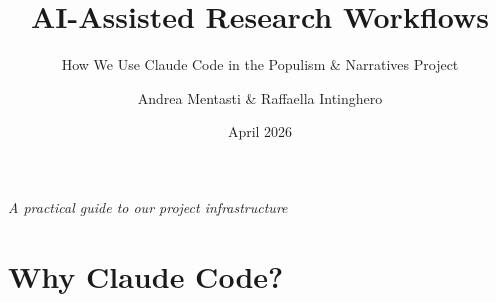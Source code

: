 \documentclass[aspectratio=169,11pt,dvipsnames]{beamer}
\title{AI-Assisted Research Workflows}
\subtitle{How We Use Claude Code in the Populism \& Narratives Project}
\author{Andrea Mentasti \& Raffaella Intinghero}
\institute{Wyss Academy for Nature}
\date{April 2026}
\begin{document}

\begin{frame}
  \titlepage
  \vspace{-0.5cm}
  \begin{center}
    \small\textit{A practical guide to our project infrastructure}
  \end{center}
\end{frame}

\section{Why Claude Code?}
\end{document}
